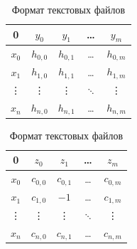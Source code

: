 \documentclass{fefu}
\begin{document}
                \begin{table}[p]
                    \centering
                    \begin{subtable}[t]{0.49\linewidth}
                        \centering
                        \begin{tabular}{|c|cccc|}
                            \hline
                            0 & $y_0$ & $y_1$ & \dots & $y_m$\\
                            \hline
                            $x_0$ & $h_{0,0}$ & $h_{0,1}$ & \dots & $h_{0,m}$\\
                            $x_1$ & $h_{1,0}$ & $h_{1,1}$ & \dots & $h_{1,m}$\\
                            \vdots & \vdots & \vdots & $\ddots$ & \vdots\\
                            $x_n$ & $h_{n,0}$ & $h_{n,1}$ & \dots & $h_{n,m}$\\
                            \hline
                        \end{tabular}
                    \end{subtable}
                    \begin{subtable}[t]{0.49\linewidth}
                        \centering
                        \begin{tabular}{|c|cccc|}
                            \hline
                            0 & $z_0$ & $z_1$ & \dots & $z_m$\\
                            \hline
                            $x_0$ & $c_{0,0}$ & $c_{0,1}$ & \dots & $c_{0,m}$\\
                            $x_1$ & $c_{1,0}$ & $-1$ & \dots & $c_{1,m}$\\
                            \vdots & \vdots & \vdots & $\ddots$ & \vdots\\
                            $x_n$ & $c_{n,0}$ & $c_{n,1}$ & \dots & $c_{n,m}$\\
                            \hline
                        \end{tabular}
                    \end{subtable}
                    \caption{\label{tbl::text_format}Формат текстовых файлов}
                \end{table}
\end{document}
